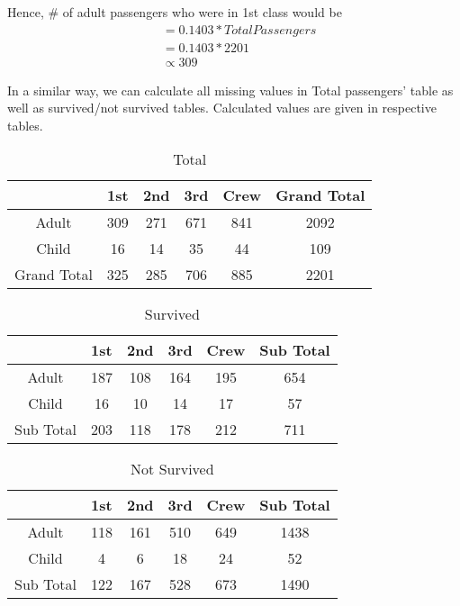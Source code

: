 \documentclass{exam}
\begin{document}
Hence, \# of adult passengers who were in 1st class would be 
\begin{align}
&= 0.1403* Total Passengers \\
&= 0.1403*2201\\
&\propto 309
\end{align}

In a similar way, we can calculate all missing values in Total passengers' table as well as survived/not survived tables.
Calculated values are given in respective tables.

\begin{table}[H]
\caption{Total}
\begin{center}
  \begin{tabular}{c | c | c | c | c | c  }
    \hline
      & 1st & 2nd & 3rd & Crew & Grand Total \\ 
     \hline              
     Adult & 309 & 271 & 671 & 841 & 2092 \\ \hline
     Child & 16 & 14 & 35 & 44 & 109 \\ \hline
     Grand Total & 325 & 285 & 706 & 885 & 2201\\ 
    
    \hline
  \end{tabular}
\end{center}
\end{table}

\begin{table}[H]
  \caption{Survived}
\begin{center}
  \begin{tabular}{c | c | c | c | c | c  }
    \hline
      & 1st & 2nd & 3rd & Crew & Sub Total \\ 
     \hline              
     Adult & 187 & 108 & 164 & 195 & 654 \\ \hline
     Child & 16 & 10 & 14 & 17 & 57\\ \hline
     Sub Total & 203 & 118 & 178 & 212 & 711\\ 
    
    \hline
  \end{tabular}
\end{center}
\end{table}

\begin{table}[H]
\caption{Not Survived}
\begin{center}
  \begin{tabular}{c | c | c | c | c | c  }
    \hline
      & 1st & 2nd & 3rd & Crew & Sub Total \\ 
     \hline              
     Adult & 118 & 161 & 510 & 649 & 1438 \\ \hline
     Child & 4 & 6 & 18 & 24 & 52 \\ \hline
     Sub Total & 122 & 167 & 528 & 673 & 1490 \\ 
    
    \hline
  \end{tabular}
\end{center}
\end{table}
\end{document}
